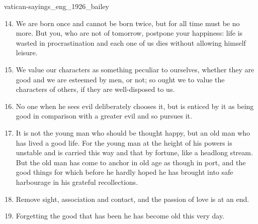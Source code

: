 \documentclass{stex}
\begin{document}
\begin{smodule}{vatican-sayings_eng_1926_bailey}
\begin{sparagraph}[id=vatican-sayings,name={Vatican Sayings}]
\begin{enumerate}[listparindent=0cm]
    \setcounter{enumi}{13}

    \item\begin{sparagraph}[id=saying:14,name=Vatican Saying 14]
      We are born once and cannot be born twice, but for all time must be no more.
      But you, who are not  of tomorrow, postpone your happiness: life is wasted in procrastination and each one of us dies without allowing himself leisure.
    \end{sparagraph}

    \item\begin{sparagraph}[id=saying:15,name=Vatican Saying 15]
      We value our characters as something peculiar to ourselves, whether they are good and we are esteemed by men, or not; so ought we to value the characters of others, if they are well-disposed to us.
    \end{sparagraph}

    \item\begin{sparagraph}[id=saying:16,name=Vatican Saying 16]
      No one when he sees evil deliberately chooses it, but is enticed by it as being good in comparison with a greater evil and so pursues it.
    \end{sparagraph}

    \item\begin{sparagraph}[id=saying:17,name=Vatican Saying 17]
      It is not the young man who should be thought happy, but an old man who has lived a good life.
      For the young man at the height of his powers is unstable and is carried this way and that by fortune, like a headlong stream.
      But the old man has come to anchor in old age as though in port, and the good things for which before he hardly hoped he has brought into safe harbourage in his grateful recollections.
    \end{sparagraph}

    \item\begin{sparagraph}[id=saying:18,name=Vatican Saying 18]
      Remove sight, association and contact, and the passion of love is at an end.
    \end{sparagraph}

    \item\begin{sparagraph}[id=saying:19,name=Vatican Saying 19]
      Forgetting the good that has been he has become old this very day.
    \end{sparagraph}


\end{enumerate}
\end{sparagraph}
\end{smodule}
\end{document}
